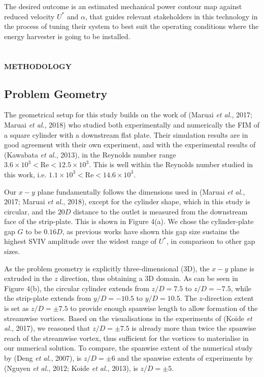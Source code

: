 \documentclass[]{article}
\begin{document}
The desired outcome is an estimated mechanical power contour map against
reduced velocity \(U^{*}\) and \(\alpha\), that guides relevant
stakeholders in this technology in the process of tuning their system to
best suit the operating conditions where the energy harvester is going
to be installed.

\section{\texorpdfstring{\protect\hypertarget{_Toc461037259}{}{\protect\hypertarget{_Toc461037442}{}{\protect\hypertarget{_Toc41048803}{}{\protect\hypertarget{_Ref520286610}{}{}}}}}{}}\label{section-2}

\textbf{METHODOLOGY}

\hypertarget{problem-geometry}{\subsection{Problem
Geometry}\label{problem-geometry}}

The geometrical setup for this study builds on the work of (Maruai
\emph{et al.}, 2017; Maruai \emph{et al.}, 2018) who studied both
experimentally and numerically the FIM of a square cylinder with a
downstream flat plate. Their simulation results are in good agreement
with their own experiment, and with the experimental results of
(Kawabata \emph{et al.}, 2013), in the Reynolds number range
\(3.6 \times 10^{3} < \text{Re} < 12.5 \times 10^{3}\). This is well
within the Reynolds number studied in this work, i.e.
\(1.1 \times 10^{3} < \text{Re} < 14.6 \times 10^{3}\).

Our \(x - y\) plane fundamentally follows the dimensions used in (Maruai
\emph{et al.}, 2017; Maruai \emph{et al.}, 2018), except for the
cylinder shape, which in this study is circular, and the \(20D\)
distance to the outlet is measured from the downstream face of the
strip-plate. This is shown in Figure 4(a). We chose the cylinder-plate
gap \(G\) to be \(0.16D\), as previous works have shown this gap size
sustains the highest SVIV amplitude over the widest range of \(U^{*}\),
in comparison to other gap sizes.

As the problem geometry is explicitly three-dimensional (3D), the
\(x - y\) plane is extruded in the \(z\) direction, thus obtaining a 3D
domain. As can be seen in Figure 4(b), the circular cylinder extends
from \(z/D = 7.5\) to \(z/D = - 7.5\), while the strip-plate extends
from \(y/D = - 10.5\) to \(y/D = 10.5\). The \(z\)-direction extent is
set as \(z/D = \pm 7.5\) to provide enough spanwise length to allow
formation of the streamwise vortices. Based on the visualisations in the
experiments of (Koide \emph{et al.}, 2017), we reasoned that
\(z/D = \pm 7.5\) is already more than twice the spanwise reach of the
streamwise vortex, thus sufficient for the vortices to materialise in
our numerical solution. To compare, the spanwise extent of the numerical
study by (Deng \emph{et al.}, 2007), is \(z/D = \pm 6\) and the spanwise
extents of experiments by (Nguyen \emph{et al.}, 2012; Koide \emph{et
al.}, 2013), is \(z/D = \pm 5\).
\end{document}

